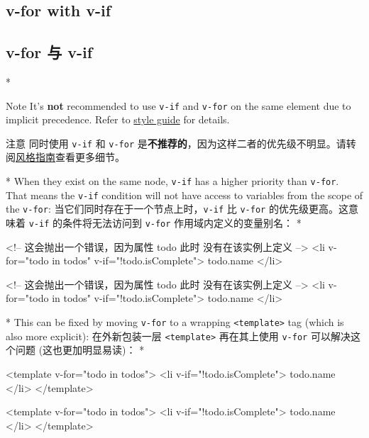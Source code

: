 \begin{paracol}{2}
\subsection{v-for with v-if}
\switchcolumn
\subsection{v-for 与 v-if}
\switchcolumn[0]*%
\begin{vueQuoteWarn}{Note}
It's \textbf{not} recommended to use \texttt{v-if} and \texttt{v-for} on
the same element due to implicit precedence. Refer to
\href{https://vuejs.org/style-guide/rules-essential.html\#avoid-v-if-with-v-for}{style
guide} for details.
\end{vueQuoteWarn}
\switchcolumn
\begin{vueQuoteWarn}{注意}
同时使用 \texttt{v-if} 和 \texttt{v-for}
是\textbf{不推荐的}，因为这样二者的优先级不明显。请转阅\href{https://cn.vuejs.org/style-guide/rules-essential.html\#avoid-v-if-with-v-for}{风格指南}查看更多细节。
\end{vueQuoteWarn}


\switchcolumn[0]*%
When they exist on the same node, \texttt{v-if} has a higher priority
than \texttt{v-for}. That means the \texttt{v-if} condition will not
have access to variables from the scope of the \texttt{v-for}:
\switchcolumn
当它们同时存在于一个节点上时，\texttt{v-if} 比 \texttt{v-for}
的优先级更高。这意味着 \texttt{v-if} 的条件将无法访问到 \texttt{v-for}
作用域内定义的变量别名：
\switchcolumn[0]*%
\begin{codeHtml}
<!--
 这会抛出一个错误，因为属性 todo 此时
 没有在该实例上定义
-->
<li v-for="todo in todos" v-if="!todo.isComplete">
  {{ todo.name }}
</li>
\end{codeHtml}
\switchcolumn
\begin{codeHtml}
<!--
 这会抛出一个错误，因为属性 todo 此时
 没有在该实例上定义
-->
<li v-for="todo in todos" v-if="!todo.isComplete">
  {{ todo.name }}
</li>
\end{codeHtml}
\switchcolumn[0]*%
This can be fixed by moving \texttt{v-for} to a wrapping
\texttt{\textless{}template\textgreater{}} tag (which is also more
explicit):
\switchcolumn
在外新包装一层 \texttt{\textless{}template\textgreater{}} 再在其上使用
\texttt{v-for} 可以解决这个问题 (这也更加明显易读)：
\switchcolumn[0]*%
\begin{codeHtml}
<template v-for="todo in todos">
  <li v-if="!todo.isComplete">
    {{ todo.name }}
  </li>
</template>
\end{codeHtml}
\switchcolumn
\begin{codeHtml}
<template v-for="todo in todos">
  <li v-if="!todo.isComplete">
    {{ todo.name }}
  </li>
</template>
\end{codeHtml}
\end{paracol}


